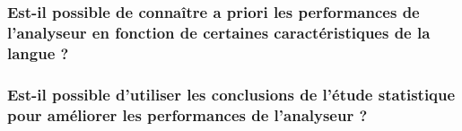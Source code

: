 \documentclass[a4paper, twoside]{article}
\begin{document}
    \subsubsection{Est-il possible de connaître a priori les performances de l’analyseur en fonction de certaines caractéristiques de la langue ?}

    \subsubsection{Est-il possible d’utiliser les conclusions de l’étude statistique pour améliorer les performances de l’analyseur ?}

\end{document}
